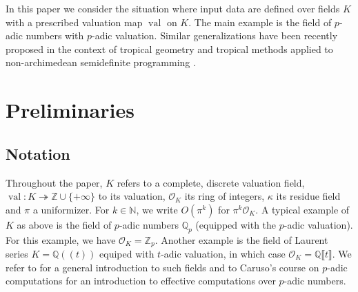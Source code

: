 \documentclass[a4paper,oneside,11pt]{article}
\newcommand{\N}{\mathbb{N}} %
\DeclareMathOperator{\val}{val}
\def\QQ{\ensuremath{\mathbb{Q}}}
\def\ZZ{\ensuremath{\mathbb{Z}}}
\newcommand{\OK}{\mathcal{O}_K}
\begin{document}
In this paper we consider the situation where input data are defined over fields $K$ with a prescribed valuation map $\val$ on $K$. The main example is the field of $p$-adic numbers with $p$-adic valuation. Similar generalizations have been recently proposed in the context of tropical geometry \cite{iriarte2022polyhedral} and tropical methods applied to non-archimedean semidefinite programming \cite{allamigeon2016solving}.



\section{Preliminaries}





\subsection{Notation}

Throughout the paper, $K$ refers to a complete,
discrete valuation field, $\val : K \twoheadrightarrow \ZZ \cup \{+\infty\}$ to its valuation,
$\OK$ its ring of integers, $\kappa$ its residue field and $\pi$ a uniformizer.
For $k \in \N$, we write $O(\pi^k)$ for $\pi^k \OK$.
A typical example of $K$ as above is the field of $p$-adic numbers 
$\QQ_p$ (equipped with the $p$-adic valuation). For this example, we 
have $\OK = \ZZ_p$.
Another example is the field of Laurent series
$K=\QQ(\!(t)\!)$ equiped with $t$-adic valuation,
in which case $\OK = \QQ \llbracket t \rrbracket$.
We refer to \cite{Serre:1979} for a
general introduction to such fields
and to Caruso's course on $p$-adic computations \cite{caruso_computations_2017}
for an introduction to effective computations over $p$-adic numbers.
\end{document}
